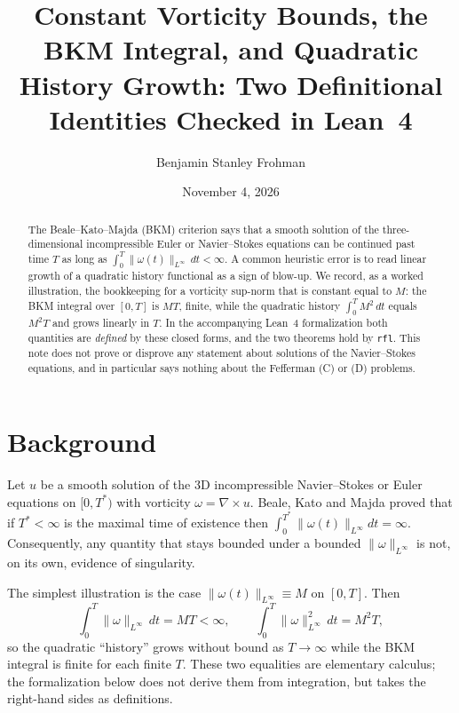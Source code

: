 
\title[Constant-bound BKM bookkeeping]{Constant Vorticity Bounds, the BKM Integral, and Quadratic History Growth: Two Definitional Identities Checked in Lean~4}
\author{Benjamin Stanley Frohman}
\date{November 4, 2026}

\begin{abstract}
The Beale--Kato--Majda (BKM) criterion says that a smooth solution of the three-dimensional incompressible Euler or Navier--Stokes equations can be continued past time $T$ as long as $\int_0^T\|\omega(t)\|_{L^\infty}\,dt<\infty$. A common heuristic error is to read linear growth of a quadratic history functional as a sign of blow-up. We record, as a worked illustration, the bookkeeping for a vorticity sup-norm that is constant equal to $M$: the BKM integral over $[0,T]$ is $M T$, finite, while the quadratic history $\int_0^T M^2\,dt$ equals $M^2T$ and grows linearly in $T$. In the accompanying Lean~4 formalization both quantities are \emph{defined} by these closed forms, and the two theorems hold by \texttt{rfl}. This note does not prove or disprove any statement about solutions of the Navier--Stokes equations, and in particular says nothing about the Fefferman (C) or (D) problems.
\end{abstract}
\maketitle

\section{Background}
Let $u$ be a smooth solution of the 3D incompressible Navier--Stokes or Euler equations on $[0,T^*)$ with vorticity $\omega=\nabla\times u$. Beale, Kato and Majda \cite{bkm} proved that if $T^*<\infty$ is the maximal time of existence then $\int_0^{T^*}\|\omega(t)\|_{L^\infty}dt=\infty$. Consequently, any quantity that stays bounded under a bounded $\|\omega\|_{L^\infty}$ is not, on its own, evidence of singularity.

The simplest illustration is the case $\|\omega(t)\|_{L^\infty}\equiv M$ on $[0,T]$. Then
\[
\int_0^T\|\omega\|_{L^\infty}\,dt=MT<\infty,\qquad \int_0^T\|\omega\|_{L^\infty}^2\,dt=M^2T,
\]
so the quadratic ``history'' grows without bound as $T\to\infty$ while the BKM integral is finite for each finite $T$. These two equalities are elementary calculus; the formalization below does not derive them from integration, but takes the right-hand sides as definitions.

